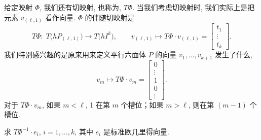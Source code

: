 给定映射 $\Phi$, 我们还有切映射, 也称为, $T\Phi$. 当我们考虑切映射时, 我们实际上是把元素 $v_{(\ell,1)}$ 看作向量. $\Phi$ 的伴随切映射是
\[
T\Phi:\;T\bigl(hP_{(\ell,1)}\bigr)\longrightarrow T\bigl(hI^k\bigr),\qquad
v_{(\ell,1)}\longmapsto T\Phi\cdot v_{(\ell,1)}=\begin{bmatrix}t_1\\\vdots\\t_k\end{bmatrix}.
\]
我们特别感兴趣的是原来用来定义平行六面体 $P$ 的向量 $v_1,\ldots,v_{k+1}$ 发生了什么, 
\[
v_m\longmapsto T\Phi\cdot v_m=\begin{bmatrix}0\\\vdots\\1\\0\\\vdots\end{bmatrix}.
\]
对于 $T\Phi\cdot v_m$, 如果 $m<\ell$, 1 在第 $m$ 个槽位；如果 $m>\ell$, 则在第 $(m-1)$ 个槽位.

\begin{question}\label{q:4-7}
求 $T\Phi^{-1}\cdot e_i$, $i=1,\ldots,k$, 其中 $e_i$ 是标准欧几里得向量.
\end{question}

